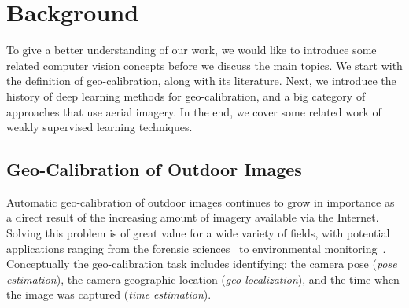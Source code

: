 \section{Background}
To give a better understanding of our work, we would like to introduce
some related computer vision concepts before we discuss the main topics.
We start with the definition of geo-calibration,
along with its literature. Next, we introduce the history of deep
learning methods for geo-calibration, and a big category of approaches
that use aerial imagery. In the end, we cover some related work
of weakly supervised learning techniques.

\subsection{Geo-Calibration of Outdoor Images}
Automatic geo-calibration of outdoor images continues to grow in
importance as a direct result of the increasing amount of imagery
available via the Internet. Solving this problem is of great value
for a wide variety of fields, with potential applications ranging from
the forensic sciences~\cite{stylianou13jane} to environmental
monitoring~\cite{zhang2012mining}. Conceptually the geo-calibration
task includes identifying: the camera pose ({\em pose estimation}),
the camera geographic location ({\em geo-localization}), and the time
when the image was captured ({\em time estimation}).

